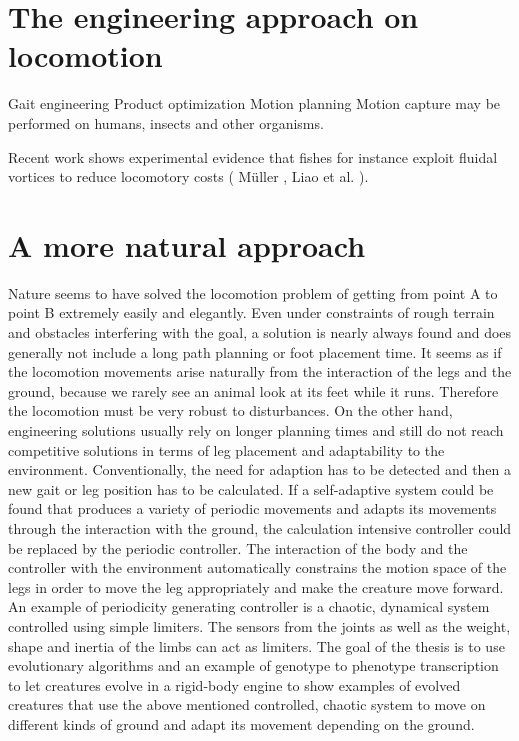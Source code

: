 \documentclass[main]{subfiles}
\begin{document}
\section{The engineering approach on locomotion}


Gait engineering
Product optimization
Motion planning
Motion capture may be performed on humans, insects and other organisms.

Recent work shows experimental evidence that fishes for instance exploit fluidal vortices to reduce locomotory costs ( Müller \cite{bib:Muller2003}, Liao et al. \cite{bib:Liao2003a,bib:Liao2003b}).

\section{A more natural approach}

Nature seems to have solved the locomotion problem of getting from point A to point B extremely easily and elegantly. Even under constraints of rough terrain and obstacles interfering with the goal, a solution is nearly always found and does generally not include a long path planning or foot placement time. It seems as if the locomotion movements arise naturally from the interaction of the legs and the ground, because we rarely see an animal look at its feet while it runs. Therefore the locomotion must be very robust to disturbances. On the other hand, engineering solutions usually rely on longer planning times and still do not reach competitive solutions in terms of leg placement and adaptability to the environment. Conventionally, the need for adaption has to be detected and then a new gait or leg position has to be calculated. If a self-adaptive system could be found that produces a variety of periodic movements and adapts its movements through the interaction with the ground, the calculation intensive controller could be replaced by the periodic controller. The interaction of the body and the controller with the environment automatically constrains the motion space of the legs in order to move the leg appropriately and make the creature move forward. An example of periodicity generating controller is a chaotic, dynamical system controlled using simple limiters. The sensors from the joints as well as the weight, shape and inertia of the limbs can act as limiters. The goal of the thesis is to use evolutionary algorithms and an example of genotype to phenotype transcription to let creatures evolve in a rigid-body engine to show examples of evolved creatures that use the above mentioned controlled, chaotic system to move on different kinds of ground and adapt its movement depending on the ground.
\end{document}
